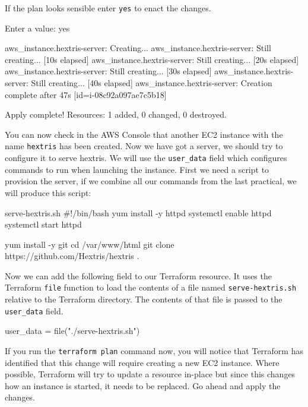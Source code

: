 \documentclass{csse4400}
\begin{document}
If the plan looks sensible enter \texttt{yes} to enact the changes.

\begin{code}[language=terraform-plan]{}
  Enter a value: yes

aws_instance.hextris-server: Creating...
aws_instance.hextris-server: Still creating... [10s elapsed]
aws_instance.hextris-server: Still creating... [20s elapsed]
aws_instance.hextris-server: Still creating... [30s elapsed]
aws_instance.hextris-server: Still creating... [40s elapsed]
aws_instance.hextris-server: Creation complete after 47s [id=i-08c92a097ae7c5b18]

Apply complete! Resources: 1 added, 0 changed, 0 destroyed.
\end{code}

You can now check in the AWS Console that another EC2 instance with the name \texttt{hextris} has been created.
Now we have got a server, we should try to configure it to serve hextris.
We will use the \texttt{user\_data} field which configures commands to run when launching the instance.
First we need a script to provision the server, if we combine all our commands from the last practical, we will produce this script:

\begin{code}[language=bash,numbers=none]{serve-hextris.sh}
#!/bin/bash
yum install -y httpd
systemctl enable httpd
systemctl start httpd

yum install -y git
cd /var/www/html
git clone https://github.com/Hextris/hextris .  
\end{code}



Now we can add the following field to our Terraform resource.
It uses the Terraform \texttt{file} function to load the contents of a file named \texttt{serve-hextris.sh} relative to the Terraform directory.
The contents of that file is passed to the \texttt{user\_data} field.

\begin{code}[language=terraform]{}
user_data = file("./serve-hextris.sh")
\end{code}

If you run the \texttt{terraform plan} command now,
you will notice that Terraform has identified that this change will require creating a new EC2 instance.
Where possible, Terraform will try to update a resource in-place but since this changes how an instance is started, it needs to be replaced.
Go ahead and apply the changes.
\end{document}

